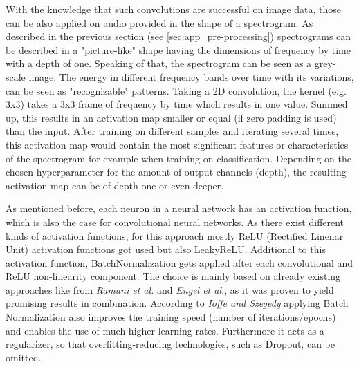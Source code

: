 With the knowledge that such convolutions are successful on image data, those can be also applied on audio provided in the shape of a spectrogram. As described in the previous section (see \ref{sec:app_pre-processing}) spectrograms can be described in a "picture-like" shape having the dimensions of frequency by time with a depth of one. Speaking of that, the spectrogram can be seen as a grey-scale image. The energy in different frequency bands over time with its variations, can be seen as "recognizable" patterns. 
Taking a 2D convolution, the kernel (e.g. 3x3) takes a 3x3 frame of frequency by time which results in one value. Summed up, this results in an activation map smaller or equal (if zero padding is used) than the input. After training on different samples and iterating several times, this activation map would contain the most significant features or characteristics of the spectrogram for example when training on classification.
Depending on the chosen hyperparameter for the amount of output channels (depth), the resulting activation map can be of depth one or even deeper. 

As mentioned before, each neuron in a neural network has an activation function, which is also the case for convolutional neural networks. As there exist different kinds of activation functions, for this approach mostly ReLU (Rectified Linenar Unit) activation functions got used but also LeakyReLU. Additional to this activation function, BatchNormalization gets applied after each convolutional and ReLU non-linearity component. The choice is mainly based on already existing approaches like from \textit{Ramani et al.}\cite{Ramani2018} and \textit{Engel et al.}\cite{Engel2017}, as it was proven to yield promising results in combination. According to \textit{Ioffe and Szegedy} \cite{ioffe2015batch} applying Batch Normalization also improves the training speed (number of iterations/epochs) and enables the use of much higher learning rates. Furthermore it acts as a regularizer, so that overfitting-reducing technologies, such as Dropout, can be omitted.

